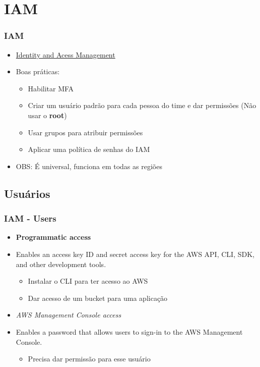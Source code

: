 \section{IAM}

\begin{frame}
	\frametitle{IAM}
	\begin{itemize}
		\item \href{https://docs.aws.amazon.com/wellarchitected/latest/security-pillar/identity-and-access-management.html}{Identity and Acess Management}
		\item Boas práticas:
			\begin{itemize}
				\item Habilitar MFA
				\item Criar um usuário padrão para cada pessoa do time e dar permissões (Não usar o \textbf{root})
				\item Usar grupos para atribuir permissões
				\item Aplicar uma política de senhas do IAM
			\end{itemize}
		\item OBS: É universal, funciona em todas as regiões
	\end{itemize}
\end{frame}

\subsection{Usuários}

\begin{frame}
	\frametitle{IAM - Users}
	\begin{itemize}
		\item \textbf{Programmatic access}
		\item Enables an access key ID and secret access key for the AWS API, CLI, SDK, and other development tools.
		\begin{itemize}
			\item Instalar o CLI para ter acesso ao AWS
			\item Dar acesso de um bucket para uma aplicação
		\end{itemize}
		\item \textit{AWS Management Console access}
		\item Enables a password that allows users to sign-in to the AWS Management Console.
		\begin{itemize}
			\item Precisa dar permissão para esse usuário
		\end{itemize}
	\end{itemize}
\end{frame}

